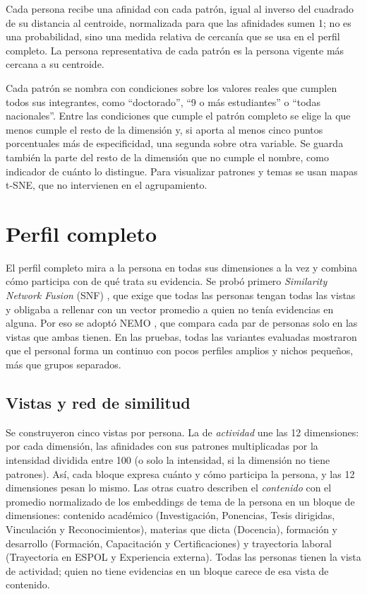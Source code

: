Cada persona recibe una afinidad con cada patrón, igual al inverso del cuadrado de su distancia al centroide, normalizada para que las afinidades sumen 1; no es una probabilidad, sino una medida relativa de cercanía que se usa en el perfil completo. La persona representativa de cada patrón es la persona vigente más cercana a su centroide.

Cada patrón se nombra con condiciones sobre los valores reales que cumplen todos sus integrantes, como ``doctorado'', ``9 o más estudiantes'' o ``todas nacionales''. Entre las condiciones que cumple el patrón completo se elige la que menos cumple el resto de la dimensión y, si aporta al menos cinco puntos porcentuales más de especificidad, una segunda sobre otra variable. Se guarda también la parte del resto de la dimensión que no cumple el nombre, como indicador de cuánto lo distingue. Para visualizar patrones y temas se usan mapas t-SNE, que no intervienen en el agrupamiento.

\section{Perfil completo}
\label{sec:met_perfil_completo}

El perfil completo mira a la persona en todas sus dimensiones a la vez y combina cómo participa con de qué trata su evidencia. Se probó primero \textit{Similarity Network Fusion} (SNF) \parencite{Wang2014}, que exige que todas las personas tengan todas las vistas y obligaba a rellenar con un vector promedio a quien no tenía evidencias en alguna. Por eso se adoptó NEMO \parencite{Rappoport2019}, que compara cada par de personas solo en las vistas que ambas tienen. En las pruebas, todas las variantes evaluadas mostraron que el personal forma un continuo con pocos perfiles amplios y nichos pequeños, más que grupos separados.

\subsection{Vistas y red de similitud}

Se construyeron cinco vistas por persona. La de \textit{actividad} une las 12 dimensiones: por cada dimensión, las afinidades con sus patrones multiplicadas por la intensidad dividida entre 100 (o solo la intensidad, si la dimensión no tiene patrones). Así, cada bloque expresa cuánto y cómo participa la persona, y las 12 dimensiones pesan lo mismo. Las otras cuatro describen el \textit{contenido} con el promedio normalizado de los embeddings de tema de la persona en un bloque de dimensiones: contenido académico (Investigación, Ponencias, Tesis dirigidas, Vinculación y Reconocimientos), materias que dicta (Docencia), formación y desarrollo (Formación, Capacitación y Certificaciones) y trayectoria laboral (Trayectoria en ESPOL y Experiencia externa). Todas las personas tienen la vista de actividad; quien no tiene evidencias en un bloque carece de esa vista de contenido.

